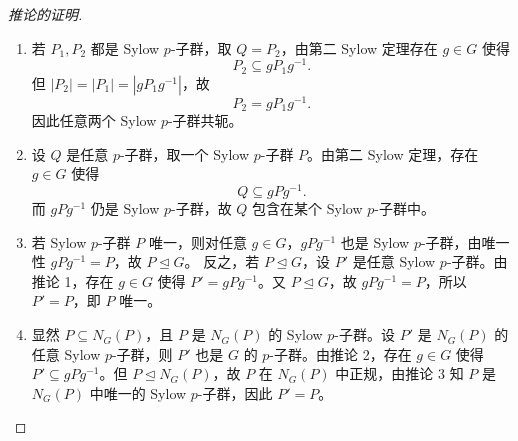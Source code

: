 \documentclass[11pt,a4paper]{ctexart}
\theoremstyle{remark}
\begin{document}
\begin{proof}[推论的证明]
\begin{enumerate}
    \item 若 \(P_1,P_2\) 都是 Sylow \(p\)-子群，取 \(Q=P_2\)，由第二 Sylow 定理存在 \(g\in G\) 使得
    \[
    P_2\subseteq gP_1g^{-1}.
    \]
    但 \(|P_2|=|P_1|=|gP_1g^{-1}|\)，故
    \[
    P_2=gP_1g^{-1}.
    \]
    因此任意两个 Sylow \(p\)-子群共轭。
    
    \item 设 \(Q\) 是任意 \(p\)-子群，取一个 Sylow \(p\)-子群 \(P\)。由第二 Sylow 定理，存在 \(g\in G\) 使得
    \[
    Q\subseteq gPg^{-1}.
    \]
    而 \(gPg^{-1}\) 仍是 Sylow \(p\)-子群，故 \(Q\) 包含在某个 Sylow \(p\)-子群中。
    
    \item 若 Sylow \(p\)-子群 \(P\) 唯一，则对任意 \(g\in G\)，\(gPg^{-1}\) 也是 Sylow \(p\)-子群，由唯一性 \(gPg^{-1}=P\)，故 \(P\trianglelefteq G\)。
    反之，若 \(P\trianglelefteq G\)，设 \(P'\) 是任意 Sylow \(p\)-子群。由推论 1，存在 \(g\in G\) 使得 \(P'=gPg^{-1}\)。又 \(P\trianglelefteq G\)，故 \(gPg^{-1}=P\)，所以 \(P'=P\)，即 \(P\) 唯一。
    
    \item 显然 \(P\subseteq N_G(P)\)，且 \(P\) 是 \(N_G(P)\) 的 Sylow \(p\)-子群。设 \(P'\) 是 \(N_G(P)\) 的任意 Sylow \(p\)-子群，则 \(P'\) 也是 \(G\) 的 \(p\)-子群。由推论 2，存在 \(g\in G\) 使得 \(P'\subseteq gPg^{-1}\)。但 \(P\trianglelefteq N_G(P)\)，故 \(P\) 在 \(N_G(P)\) 中正规，由推论 3 知 \(P\) 是 \(N_G(P)\) 中唯一的 Sylow \(p\)-子群，因此 \(P'=P\)。
\end{enumerate}
\end{proof}
\end{document}
